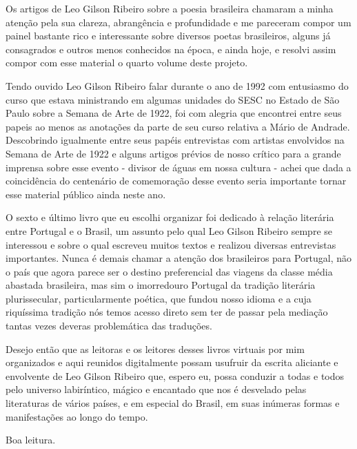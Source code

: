 Os artigos de Leo Gilson Ribeiro sobre a poesia brasileira chamaram a
minha atenção pela sua clareza, abrangência e profundidade e me
pareceram compor um painel bastante rico e interessante sobre diversos
poetas brasileiros, alguns já consagrados e outros menos conhecidos na
época, e ainda hoje, e resolvi assim compor com esse material o quarto
volume deste projeto.

Tendo ouvido Leo Gilson Ribeiro falar durante o ano de 1992 com
entusiasmo do curso que estava ministrando em algumas unidades do SESC
no Estado de São Paulo sobre a Semana de Arte de 1922, foi com alegria
que encontrei entre seus papeis ao menos as anotações da parte de seu
curso relativa a Mário de Andrade. Descobrindo igualmente entre seus
papéis entrevistas com artistas envolvidos na Semana de Arte de 1922 e
alguns artigos prévios de nosso crítico para a grande imprensa sobre
esse evento - divisor de águas em nossa cultura - achei que dada a
coincidência do centenário de comemoração desse evento seria importante
tornar esse material público ainda neste ano.

O sexto e último livro que eu escolhi organizar foi dedicado à relação
literária entre Portugal e o Brasil, um assunto pelo qual Leo Gilson
Ribeiro sempre se interessou e sobre o qual escreveu muitos textos e
realizou diversas entrevistas importantes. Nunca é demais chamar a
atenção dos brasileiros para Portugal, não o país que agora parece ser o
destino preferencial das viagens da classe média abastada brasileira,
mas sim o imorredouro Portugal da tradição literária plurissecular,
particularmente poética, que fundou nosso idioma e a cuja riquíssima
tradição nós temos acesso direto sem ter de passar pela mediação tantas
vezes deveras problemática das traduções.

Desejo então que as leitoras e os leitores desses livros virtuais por
mim organizados e aqui reunidos digitalmente possam usufruir da escrita
aliciante e envolvente de Leo Gilson Ribeiro que, espero eu, possa
conduzir a todas e todos pelo universo labiríntico, mágico e encantado
que nos é desvelado pelas literaturas de vários países, e em especial do
Brasil, em suas inúmeras formas e manifestações ao longo do tempo.

Boa leitura.

\cleardoublepage
